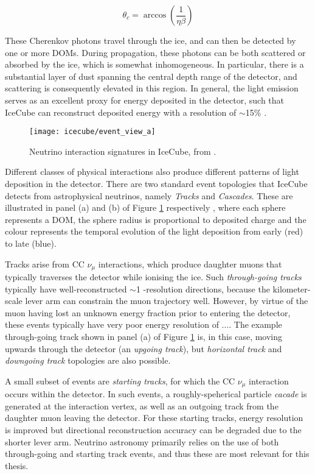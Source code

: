 \begin{equation}
	\theta_{c} =  \arccos \left( \frac{1}{\eta \beta} \right)
\end{equation}

These Cherenkov photons travel through the ice, and can then be detected by one or more DOMs. During propagation, these photons can be both scattered or absorbed by the ice, which is somewhat inhomogeneous. In particular, there is a substantial layer of dust spanning the central depth range of the detector, and scattering is consequently elevated in this region. In general, the light emission serves as an excellent proxy for energy deposited in the detector, such that IceCube can reconstruct deposited energy with a resolution of $\sim$15\% . 

\begin{figure}
	\centering \texttt{[image: icecube/event\_view\_a]}
	\caption{Neutrino interaction signatures in IceCube, from \cite{kintscher_thesis}.}
	\label{fig:event_views}
\end{figure}

Different classes of physical interactions also produce different patterns of light deposition in the detector. There are two standard event topologies that IceCube detects from astrophysical neutrinos, namely \emph{Tracks} and \emph{Cascades}. These are illustrated in panel (a) and (b) of Figure \ref{fig:event_views} respectively , where each sphere represents a DOM, the sphere radius is proportional to deposited charge and the colour represents the temporal evolution of the light deposition from early (red) to late (blue). 

Tracks arise from CC $\nu_{\mu}$ interactions, which produce daughter muons that typically traverses the detector while ionising the ice. Such \emph{through-going tracks} typically have well-reconstructed $\sim$1 \arcdeg-resolution directions, because the kilometer-scale lever arm can constrain the muon trajectory well. However, by virtue of the muon having lost an unknown energy fraction prior to entering the detector, these events typically have very poor energy resolution of .... The example through-going track shown in panel (a) of Figure \ref{fig:event_views} is, in this case, moving upwards through the detector (an \emph{upgoing track}), but \emph{horizontal track} and \emph{downgoing track} topologies are also possible. 

A small subset of events are \emph{starting tracks}, for which the CC $\nu_{\mu}$ interaction occurs within the detector. In such events, a roughly-speherical particle \emph{cacade} is generated at the interaction vertex, as well as an outgoing track from the daughter muon leaving the detector. For these starting tracks, energy resolution is improved but directional reconstruction accuracy can be degraded due to the shorter lever arm. Neutrino astronomy primarily relies on the use of both through-going and starting track events, and thus these are most relevant for this thesis. 

